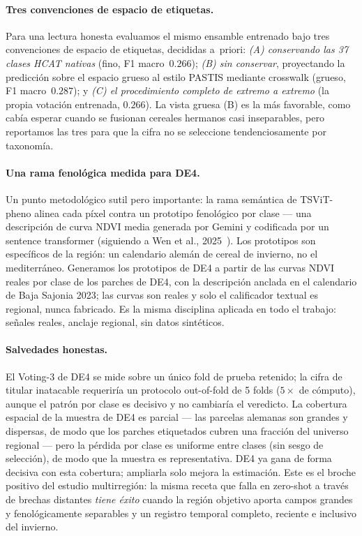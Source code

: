 \paragraph{Tres convenciones de espacio de etiquetas.}
Para una lectura honesta evaluamos el mismo ensamble entrenado bajo tres
convenciones de espacio de etiquetas, decididas a~priori: \emph{(A)
conservando las 37 clases HCAT nativas} (fino, F1 macro~$0.266$);
\emph{(B) sin conservar}, proyectando la predicción sobre el espacio
grueso al estilo PASTIS mediante crosswalk (grueso, F1 macro~$0.287$); y
\emph{(C) el procedimiento completo de extremo a extremo} (la propia
votación entrenada, $0.266$). %
La vista gruesa (B) es la más favorable, como cabía esperar cuando se
fusionan cereales hermanos casi inseparables, pero reportamos las tres
para que la cifra no se seleccione tendenciosamente por taxonomía.

\paragraph{Una rama fenológica medida para DE4.}
Un punto metodológico sutil pero importante: la rama semántica de
TSViT-pheno alinea cada píxel contra un prototipo fenológico por clase
--- una descripción de curva NDVI media generada por Gemini y codificada
por un sentence transformer (siguiendo a Wen et al.,
2025~\cite{wen2025phenology}). Los prototipos son específicos de la
región: un calendario alemán de cereal de invierno, no el mediterráneo.
Generamos los prototipos de DE4 a partir de las curvas NDVI reales por
clase de los parches de DE4, con la descripción anclada en el calendario
de Baja Sajonia 2023; las curvas son reales y solo el calificador
textual es regional, nunca fabricado. Es la misma disciplina aplicada en
todo el trabajo: señales reales, anclaje regional, sin datos sintéticos.

\paragraph{Salvedades honestas.}
El Voting-3 de DE4 se mide sobre un único fold de prueba retenido; la
cifra de titular inatacable requeriría un protocolo out-of-fold de 5
folds ($5\times$ de cómputo), aunque el patrón por clase es decisivo y no
cambiaría el veredicto. La cobertura espacial de la muestra de DE4 es
parcial --- las parcelas alemanas son grandes y dispersas, de modo que
los parches etiquetados cubren una fracción del universo regional ---
pero la pérdida por clase es uniforme entre clases (sin sesgo de
selección), de modo que la muestra es representativa. DE4 ya gana de
forma decisiva con esta cobertura; ampliarla solo mejora la estimación.
Este es el broche positivo del estudio multirregión: la misma receta que
falla en zero-shot a través de brechas distantes \emph{tiene éxito}
cuando la región objetivo aporta campos grandes y fenológicamente
separables y un registro temporal completo, reciente e inclusivo del
invierno.
